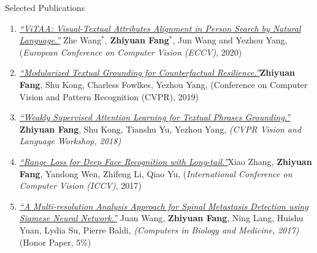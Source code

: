 \documentclass{resume} %
\begin{document}
\begin{rSection}{Selected Publications}
\begin{enumerate}
    \item \href{https://arxiv.org/abs/2005.07327}{\textit{``ViTAA: Visual-Textual Attributes Alignment in Person Search by Natural Language.''}} {Zhe Wang$^*$, \textbf{{Zhiyuan Fang$^*$}}, Jun Wang and Yezhou Yang, ({\textit{European Conference on Computer Vision (ECCV)}}, 2020)}
    
    
    \item \href{https://openaccess.thecvf.com/content_CVPR_2019/papers/Fang_Modularized_Textual_Grounding_for_Counterfactual_Resilience_CVPR_2019_paper.pdf}{\textit{``Modularized Textual Grounding for Counterfactual Resilience.''}}{\textbf{Zhiyuan Fang}, Shu Kong, Charless Fowlkes, Yezhou Yang, ({Conference on Computer Vision and Pattern Recognition (CVPR)}, 2019)}
    
    
    \item \href{https://arxiv.org/abs/1805.00545} {\textit{``Weakly Supervised Attention Learning for Textual Phrases Grounding.''}} {\textbf{{Zhiyuan Fang}}, Shu Kong, Tianshu Yu, Yezhou Yang, \textit{({CVPR Vision and Language Workshop}, 2018)}}
    
    \item \href{https://arxiv.org/abs/1611.08976} {\textit{``Range Loss for Deep Face Recognition with Long-tail.''}}{Xiao Zhang, \textbf{{Zhiyuan Fang}}, Yandong Wen, Zhifeng Li, Qiao Yu, ({\textit{International Conference on Computer Vision (ICCV)}}, 2017)}
    
    \item \href{http://www.sciencedirect.com/science/article/pii/S0010482517300793} {\textit{``A Multi-resolution Analysis Approach for Spinal Metastasis Detection using Siamese Neural Network.''}} {Juan Wang, \textbf{{Zhiyuan Fang}}, Ning Lang,  Huishu Yuan, Lydia Su,  Pierre Baldi,
    \textit{{(Computers in Biology and Medicine}, 2017)}}(Honor Paper, 5\%)

\end{enumerate}


\end{rSection}
\end{document}
